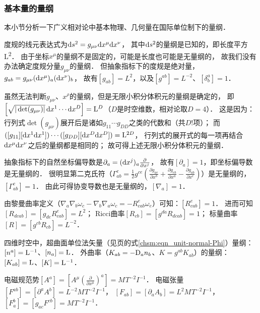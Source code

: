 \subsubsection{基本量的量纲}\label{chunit-dim:sec_basic-dim}
本小节分析一下广义相对论中基本物理、几何量在国际单位制下的量纲．

度规的线元表达式为${\rm d}s^2 = g_{\mu\nu} {\rm d}x^\mu {\rm d}x^\nu$，
其中${\rm d}s^2$的量纲是已知的，即长度平方\si{L^{2}}．
由于坐标$x^\mu$的量纲不是固定的，可能是长度也可能是无量纲的，
故我们没有办法确定度规分量$g_{\mu\nu}$的量纲．
但抽象指标下的度规是绝对量，$g_{ab}=g_{\mu\nu} ({\rm d}x^\mu)_a ({\rm d}x^\nu)_b$，
故有$[g_{ab}]=\si{L^{2}}$，以及$[g^{ab}]=\si{L^{-2}}$、$[\delta^{a}_b]=1$．

虽然无法判断$g_{\mu\nu}$、$x^\rho$的量纲，但是无限小积分体积元的量纲是确定的，
即$\left[\sqrt{|\det(g_{\mu\nu})|}\,{\rm d} x^1\cdots {\rm d} x^D\right]={\rm L}^D$（$D$是时空维数，相对论取$D=4$）．
这是因为：行列式$\det(g_{\mu\nu})$展开后是诸如$g_{11}\cdots g_{DD}$之类的代数和（共$D!$项）；
而$([g_{11}][{\rm d} x^1 {\rm d} x^1] )\cdots ([g_{DD}][{\rm d} x^D {\rm d} x^D] )= {\rm L}^{2D}$，
行列式的展开式的每一项再结合${\rm d} x^\mu {\rm d} x^\nu $之后的量纲都是相同的；
故可得上述无限小积分体积元的量纲．

抽象指标下的自然坐标偏导数是$\partial_a =({\rm d }x^j)_a \frac{\partial}{\partial x^j}$，
故有$[\partial_a]=1$，即坐标偏导数是无量纲的．
很明显第二克氏符（$\Gamma_{ab}^c = \frac{1}{2}{g^{ce}}\left( {\frac{{\partial {g_{ae}}}}{{\partial {x^b}}}
    + \frac{{\partial {g_{eb}}}}{{\partial {x^a}}}  - \frac{{\partial {g_{ab}}}}
    {{\partial {x^e}}}} \right)$）是无量纲的，$[\Gamma_{ab}^c]=1$．
由此可得协变导数也是无量纲的，$[\nabla_{a}]=1$．

由黎曼曲率定义（${\nabla_a}{\nabla_b}{\omega_c} - {\nabla_b}{\nabla_a}{\omega_c}
= -R_{cab}^e{\omega _e}$）可知：$[R_{cab}^e]=1$．
进而可知$[R_{dcab}]=[g_{de}R_{cab}^e]=\si{L^{2}}$；
Ricci曲率$[R_{cb}]=[g^{da}R_{dcab}]=1$；
标量曲率$[R]=[g^{cb}R_{cb}]=\si{L^{-2}}$．


四维时空中，超曲面单位法矢量（见\pageref{chsm:eqn_unit-normal-Phi}页的式\eqref{chsm:eqn_unit-normal-Phi}）量纲：
$[n^a]={\rm L}^{-1}$、$[n_a]={\rm L}$．
外曲率（$K_{ab} =- {\rm D}_a n_b$、$K = g^{ab} K_{ab}$）的量纲：
$[K_{ab}]={\rm L}$、$[K]={\rm L}^{-1}$．


电磁规范势$[A^a]=[A^\mu (\frac{\partial}{\partial x^\mu})^a]= \si{M^{}T^{-2}I^{-1}}$．
电磁张量$[F^{ab}]=[\partial^a A^b]=\si{L^{-2}M^{}T^{-2}I^{-1}}$，
$[F_{ab}]=[\partial_a A_b]=\si{L^{2}M^{}T^{-2}I^{-1}}$，
$[F_{a}^b]=[g_{ac} F^{cb}]=\si{M^{}T^{-2}I^{-1}}$．

